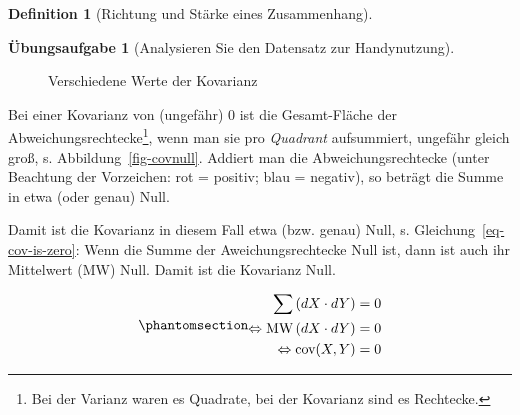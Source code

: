 \documentclass[
  a4paper,
  DIV=11]{scrreprt}
\theoremstyle{definition}
\newtheorem{exercise}{Übungsaufgabe}[chapter]
\theoremstyle{definition}
\theoremstyle{definition}
\newtheorem{definition}{Definition}[chapter]
\theoremstyle{remark}
\begin{document}
\begin{definition}[Richtung und Stärke eines
Zusammenhang]
\begin{exercise}[Analysieren Sie den Datensatz zur
Handynutzung]
\begin{figure}
\begin{minipage}{0.33\linewidth}
{}


\end{minipage}%
%
\begin{minipage}{0.33\linewidth}



\end{minipage}%

\caption{\label{fig-demos-cov}Verschiedene Werte der Kovarianz}

\end{figure}%

Bei einer Kovarianz von (ungefähr) 0 ist die Gesamt-Fläche der
Abweichungsrechtecke\footnote{Bei der Varianz waren es Quadrate, bei der
  Kovarianz sind es Rechtecke.}, wenn man sie pro \emph{Quadrant}
aufsummiert, ungefähr gleich groß, s. Abbildung~\ref{fig-covnull}.
Addiert man die Abweichungsrechtecke (unter Beachtung der Vorzeichen:
rot = positiv; blau = negativ), so beträgt die Summe in etwa (oder
genau) Null.

Damit ist die Kovarianz in diesem Fall etwa (bzw. genau) Null, s.
Gleichung~\ref{eq-cov-is-zero}: Wenn die Summe der Aweichungsrechtecke
Null ist, dann ist auch ihr Mittelwert (MW) Null. Damit ist die
Kovarianz Null.

\begin{equation}\phantomsection\label{eq-cov-is-zero}{\begin{aligned}
\sum \left(dX \cdot dY \right) &= 0\\
\Leftrightarrow \text{MW} \left(dX \cdot dY \right) &= 0\\
\Leftrightarrow \text{cov}(X, Y) &= 0
\end{aligned}}\end{equation}


\end{exercise}
\end{definition}
\end{document}
